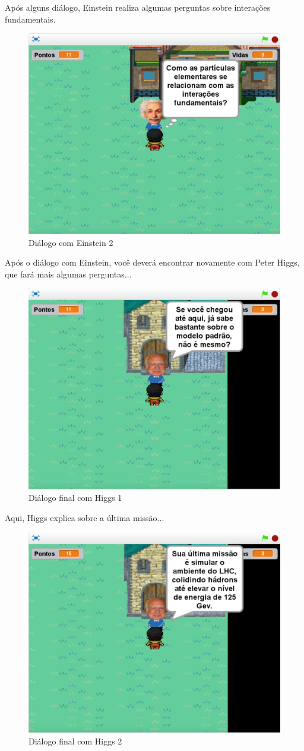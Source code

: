 \documentclass[12pt,fleqn]{book} %
\begin{document}
\newpage

Após alguns diálogo, Einstein realiza algumas perguntas sobre interações fundamentais.

\begin{figure}[h]
	\centering
	\includegraphics[width=0.65 \textwidth]{Produto/jogo_16}
	\caption{Diálogo com Einstein 2}
	\label{fig:app_a:jogo16}
\end{figure}


Após o diálogo com Einstein, você deverá encontrar novamente com Peter Higgs, que fará mais algumas perguntas...

\begin{figure}[h]
	\centering
	\includegraphics[width=0.65 \textwidth]{Produto/jogo_17}
	\caption{Diálogo final com Higgs 1}
	\label{fig:app_a:jogo17}
\end{figure}

\newpage

Aqui, Higgs explica sobre a última missão...

\begin{figure}[h]
	\centering
	\includegraphics[width=0.65 \textwidth]{Produto/jogo_18}
	\caption{Diálogo final com Higgs 2}
	\label{fig:app_a:jogo18}
\end{figure}
\end{document}
